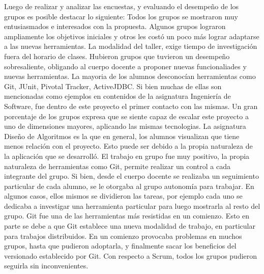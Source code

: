 Luego de realizar y analizar  las encuestas, y evaluando el desempeño de los grupos es posible destacar lo siguiente: Todos los
grupos se mostraron muy entusiasmados e interesados con la propuesta. Algunos grupos lograron ampliamente
los objetivos iniciales y otros les costó un poco más lograr adaptarse a las nuevas herramientas.
La modalidad del taller, exige tiempo de investigación fuera del horario de clases. Hubieron grupos que tuvieron un desempeño sobresaliente, obligando al cuerpo docente a proponer nuevas funcionaliades y nuevas herramientas.  
La mayoria de los alumnos desconocían herramientas como Git, JUnit, Pivotal Tracker, ActiveJDBC. Si bien muchas de ellas son mencionadas como ejemplos en contenidos de la asignatura Ingeniería de Software, fue dentro de este proyecto el primer contacto con las mismas. Un gran porcentaje de los grupos expresa que se siente capaz de escalar este proyecto a uno de dimensiones mayores, aplicando las mismas tecnologias. La asignatura Diseño de Algoritmos es la que en general, los alumnos visualizan que tiene menos relación con el proyecto. Esto puede ser debido a la propia naturaleza de la aplicación que se desarrolló. El trabajo en grupo fue muy positivo, la propia naturaleza de herramientas como Git, permite realizar un control a cada integrante del grupo. Si bien, desde el cuerpo docente se realizaba un seguimiento particular de cada alumno, se le otorgaba al grupo autonomía para trabajar. En algunos casos, ellos mismos se dividieron las tareas, por ejemplo cada uno se dedicaba a investigar una herramienta particular para luego mostrarla al resto del grupo. Git fue una de las herramientas
más resistidas en un comienzo. Esto en parte se debe a que Git  establece una nueva modalidad de trabajo, en particular para trabajos distribuidos. En un comienzo provocaba problemas en muchos grupos, hasta que pudieron adoptarla, y finalmente sacar los beneficios  del versionado establecido por Git. 
Con respecto a Scrum, todos los grupos pudieron seguirla sin inconvenientes.  